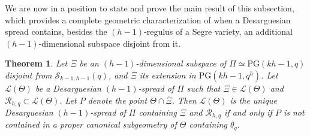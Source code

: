 \documentclass[11pt]{article}
\newtheorem{theorem}{Theorem}[section]
\theoremstyle{definition}
\numberwithin{equation}{section}
\def\cL{\mathcal L}
\def\cR{\mathcal R}
\def\cS{\mathcal S}
\def\PG{\mathrm{PG}}
\begin{document}
We are now in a position to state and prove the main result of this subsection,
which provides a complete geometric characterization of when a Desarguesian
spread contains, besides the $(h-1)$-regulus of a Segre variety, an additional
$(h-1)$-dimensional subspace disjoint from it.


\begin{theorem}\label{thm:theta}
Let $\Xi$ be an $(h-1)$-dimensional subspace of $\Pi \simeq \PG(kh-1, q)$ disjoint from $\cS_{k-1, h-1}(q)$, and $\overline{\Xi}$ its extension in $\PG(kh-1, q^h)$. Let $\cL(\Theta)$ be a Desarguesian $(h-1)$-spread of $\Pi$ such that $\Xi \in \cL(\Theta)$ and $\cR_{h, q} \subset \cL(\Theta)$. Let $P$ denote the point $\Theta \cap \overline{\Xi}$. Then $\cL(\Theta)$ is the unique Desarguesian $(h-1)$-spread of $\Pi$ containing $\Xi$ and $\cR_{h, q}$ if and only if $P$ is not contained in a proper canonical subgeometry of $\Theta$ containing $\theta_q$.
\end{theorem}
\end{document}

